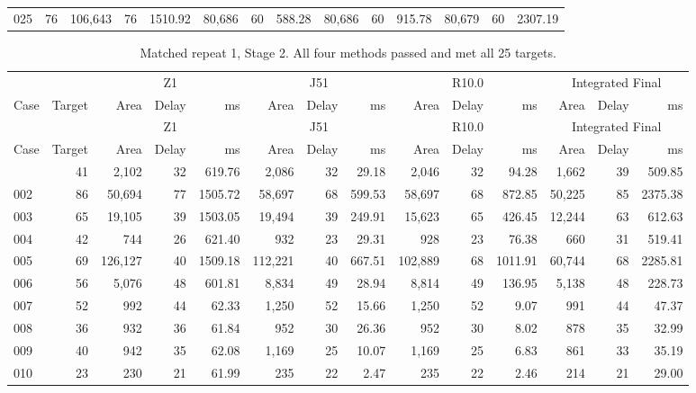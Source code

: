 {\begin{longtable}{@{}lr*{4}{rrr}@{}}
025 & 76 & 106,643 & 76 & 1510.92 & 80,686 & 60 & 588.28 & 80,686 & 60 & 915.78 & 80,679 & 60 & 2307.19 \\
\end{longtable}
\begin{longtable}{@{}lr*{4}{rrr}@{}}
\caption{Matched repeat 1, Stage 2. All four methods passed and met all 25 targets.}\\
\toprule
 & & \multicolumn{3}{c}{Z1} & \multicolumn{3}{c}{J51} & \multicolumn{3}{c}{R10.0} & \multicolumn{3}{c}{Integrated Final} \\
\cmidrule(lr){3-5}\cmidrule(lr){6-8}\cmidrule(lr){9-11}\cmidrule(lr){12-14}
Case & Target & Area & Delay & ms & Area & Delay & ms & Area & Delay & ms & Area & Delay & ms \\
\midrule
\endfirsthead
\toprule
 & & \multicolumn{3}{c}{Z1} & \multicolumn{3}{c}{J51} & \multicolumn{3}{c}{R10.0} & \multicolumn{3}{c}{Integrated Final} \\
\cmidrule(lr){3-5}\cmidrule(lr){6-8}\cmidrule(lr){9-11}\cmidrule(lr){12-14}
Case & Target & Area & Delay & ms & Area & Delay & ms & Area & Delay & ms & Area & Delay & ms \\
\midrule
\endhead
\bottomrule
\endlastfoot
001 & 41 & 2,102 & 32 & 619.76 & 2,086 & 32 & 29.18 & 2,046 & 32 & 94.28 & 1,662 & 39 & 509.85 \\
002 & 86 & 50,694 & 77 & 1505.72 & 58,697 & 68 & 599.53 & 58,697 & 68 & 872.85 & 50,225 & 85 & 2375.38 \\
003 & 65 & 19,105 & 39 & 1503.05 & 19,494 & 39 & 249.91 & 15,623 & 65 & 426.45 & 12,244 & 63 & 612.63 \\
004 & 42 & 744 & 26 & 621.40 & 932 & 23 & 29.31 & 928 & 23 & 76.38 & 660 & 31 & 519.41 \\
005 & 69 & 126,127 & 40 & 1509.18 & 112,221 & 40 & 667.51 & 102,889 & 68 & 1011.91 & 60,744 & 68 & 2285.81 \\
006 & 56 & 5,076 & 48 & 601.81 & 8,834 & 49 & 28.94 & 8,814 & 49 & 136.95 & 5,138 & 48 & 228.73 \\
007 & 52 & 992 & 44 & 62.33 & 1,250 & 52 & 15.66 & 1,250 & 52 & 9.07 & 991 & 44 & 47.37 \\
008 & 36 & 932 & 36 & 61.84 & 952 & 30 & 26.36 & 952 & 30 & 8.02 & 878 & 35 & 32.99 \\
009 & 40 & 942 & 35 & 62.08 & 1,169 & 25 & 10.07 & 1,169 & 25 & 6.83 & 861 & 33 & 35.19 \\
010 & 23 & 230 & 21 & 61.99 & 235 & 22 & 2.47 & 235 & 22 & 2.46 & 214 & 21 & 29.00 \\

\end{longtable}}
